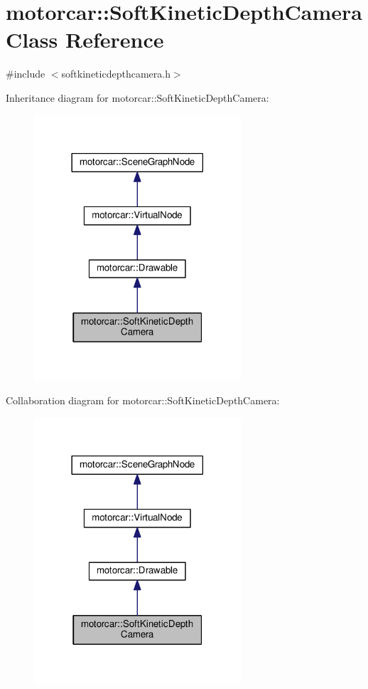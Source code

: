 \hypertarget{classmotorcar_1_1SoftKineticDepthCamera}{\section{motorcar\-:\-:Soft\-Kinetic\-Depth\-Camera Class Reference}
\label{classmotorcar_1_1SoftKineticDepthCamera}
}


{\ttfamily \#include $<$softkineticdepthcamera.\-h$>$}



Inheritance diagram for motorcar\-:\-:Soft\-Kinetic\-Depth\-Camera\-:
\nopagebreak
\begin{figure}[H]
\begin{center}
\leavevmode
\includegraphics[width=218pt]{classmotorcar_1_1SoftKineticDepthCamera__inherit__graph}
\end{center}
\end{figure}


Collaboration diagram for motorcar\-:\-:Soft\-Kinetic\-Depth\-Camera\-:
\nopagebreak
\begin{figure}[H]
\begin{center}
\leavevmode
\includegraphics[width=218pt]{classmotorcar_1_1SoftKineticDepthCamera__coll__graph}
\end{center}
\end{figure}
